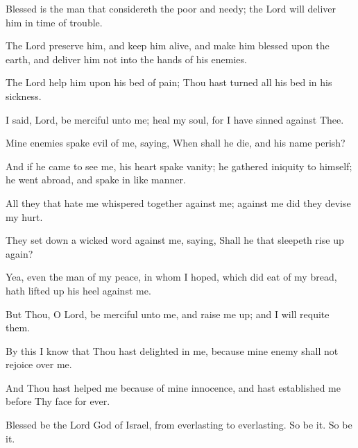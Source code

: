 Blessed is the man that considereth the poor and needy; the Lord will deliver him in time of trouble.

The Lord preserve him, and keep him alive, and make him blessed upon the earth, and deliver him not into the hands of his enemies.

The Lord help him upon his bed of pain; Thou hast turned all his bed in his sickness.

I said, Lord, be merciful unto me; heal my soul, for I have sinned against Thee.

Mine enemies spake evil of me, saying, When shall he die, and his name perish?

And if he came to see me, his heart spake vanity; he gathered iniquity to himself; he went abroad, and spake in like manner.

All they that hate me whispered together against me; against me did they devise my hurt.

They set down a wicked word against me, saying, Shall he that sleepeth rise up again?

Yea, even the man of my peace, in whom I hoped, which did eat of my bread, hath lifted up his heel against me.

But Thou, O Lord, be merciful unto me, and raise me up; and I will requite them.

By this I know that Thou hast delighted in me, because mine enemy shall not rejoice over me.

And Thou hast helped me because of mine innocence, and hast established me before Thy face for ever.

Blessed be the Lord God of Israel, from everlasting to everlasting. So be it. So be it.
